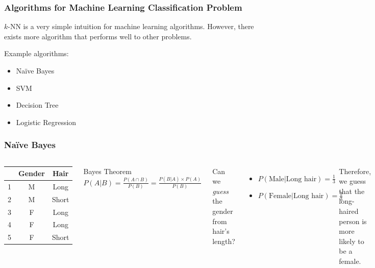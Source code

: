 \documentclass[aspectratio=169]{beamer}
\begin{document}
\begin{frame}
	\frametitle{Algorithms for Machine Learning Classification Problem}
	 $k$-NN is a very simple intuition for machine learning algorithms. However, there exists more algorithm that performs well to other problems.

	 Example algorithms:
	\begin{itemize}
		\item<4-> Na\"{i}ve Bayes
		\item<5-> SVM
		\item<6-> Decision Tree
		\item<7-> Logistic Regression
	\end{itemize}
\end{frame}

\begin{frame}
	\frametitle{Na\"ive Bayes}
	\begin{columns}
		\begin{center}
			\begin{tabular}{|c | c c |}
				\hline
				  & Gender & Hair  \\ [0.5ex]
				\hline\hline
				1 & M      & Long  \\
				\hline
				2 & M      & Short \\
				\hline
				3 & F      & Long  \\
				\hline
				4 & F      & Long  \\
				\hline
				5 & F      & Short \\ [1ex]
				\hline
			\end{tabular}
		\end{center}
		\begin{block}{Bayes Theorem}
			$P(A|B) = \frac{P(A \cap B)}{P(B)} = \frac{P(B|A) \times P(A)}{P(B)}$
		\end{block}
		Can we \textit{guess} the gender from hair's length?
		\begin{itemize}
			\item $P(\textrm{Male}|\textrm{Long hair}) = \frac{1}{3}$
			\item $P(\textrm{Female}|\textrm{Long hair}) = \frac{2}{3}$
		\end{itemize}
		Therefore, we guess that the long-haired person is more likely to be a female.
	\end{columns}
\end{frame}
\end{document}
